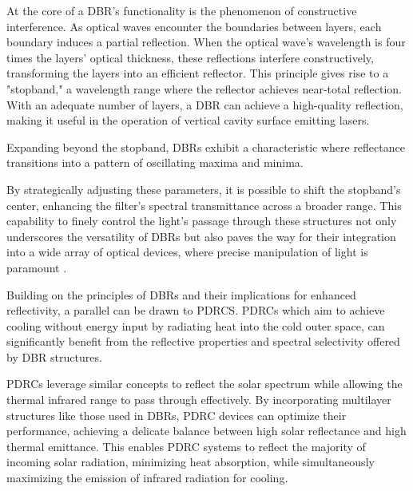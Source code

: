 At the core of a DBR's functionality is the phenomenon of constructive interference. As optical waves encounter the boundaries between layers, each boundary induces a partial reflection. When the optical wave's wavelength is four times the layers' optical thickness, these reflections interfere constructively, transforming the layers into an efficient reflector. This principle gives rise to a "stopband," a wavelength range where the reflector achieves near-total reflection. With an adequate number of layers, a DBR can achieve a high-quality reflection, making it useful in the operation of vertical cavity surface emitting lasers. %

Expanding beyond the stopband, DBRs exhibit a characteristic where reflectance transitions into a pattern of oscillating maxima and minima.

By strategically adjusting these parameters, it is possible to shift the stopband's center, enhancing the filter's spectral transmittance across a broader range. This capability to finely control the light's passage through these structures not only underscores the versatility of DBRs but also paves the way for their integration into a wide array of optical devices, where precise manipulation of light is paramount \cite{pedrotti_introduction_2007}.

Building on the principles of DBRs and their implications for enhanced reflectivity, a parallel can be drawn to PDRCS. PDRCs which aim to achieve cooling without energy input by radiating heat into the cold outer space, can significantly benefit from the reflective properties and spectral selectivity offered by DBR structures.

PDRCs leverage similar concepts to reflect the solar spectrum while allowing the thermal infrared range to pass through effectively. By incorporating multilayer structures like those used in DBRs, PDRC devices can optimize their performance, achieving a delicate balance between high solar reflectance and high thermal emittance. This enables PDRC systems to reflect the majority of incoming solar radiation, minimizing heat absorption, while simultaneously maximizing the emission of infrared radiation for cooling.

